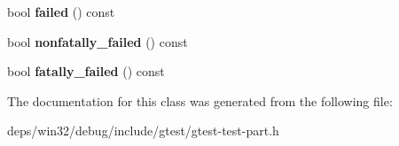\begin{DoxyCompactItemize}
\item 
\hypertarget{classtesting_1_1_test_part_result_aaf835515fb53eb1aa01c1798b05e61f6}{}bool {\bfseries failed} () const \label{classtesting_1_1_test_part_result_aaf835515fb53eb1aa01c1798b05e61f6}

\item 
\hypertarget{classtesting_1_1_test_part_result_a7bb08c87fbc1664f9fcca1504339ed29}{}bool {\bfseries nonfatally\+\_\+failed} () const \label{classtesting_1_1_test_part_result_a7bb08c87fbc1664f9fcca1504339ed29}

\item 
\hypertarget{classtesting_1_1_test_part_result_a34d31718b5fc6c06f73d03e8dbb1aa9e}{}bool {\bfseries fatally\+\_\+failed} () const \label{classtesting_1_1_test_part_result_a34d31718b5fc6c06f73d03e8dbb1aa9e}

\end{DoxyCompactItemize}


The documentation for this class was generated from the following file\+:\begin{DoxyCompactItemize}
\item 
deps/win32/debug/include/gtest/gtest-\/test-\/part.\+h\end{DoxyCompactItemize}
